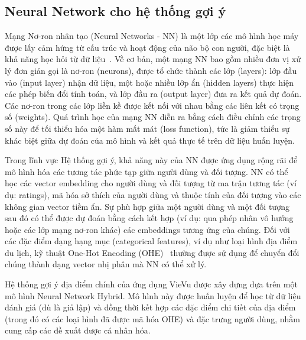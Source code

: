 \subsection{Neural Network cho hệ thống gợi ý}


Mạng Nơ-ron nhân tạo (Neural Networks - NN) là một lớp các mô hình học máy được lấy cảm hứng từ cấu trúc và hoạt động của não bộ con người, đặc biệt là khả năng học hỏi từ dữ liệu~\cite{nn_deep_learning_book}. Về cơ bản, một mạng NN bao gồm nhiều đơn vị xử lý đơn giản gọi là nơ-ron (neurons), được tổ chức thành các lớp (layers): lớp đầu vào (input layer) nhận dữ liệu, một hoặc nhiều lớp ẩn (hidden layers) thực hiện các phép biến đổi tính toán, và lớp đầu ra (output layer) đưa ra kết quả dự đoán. Các nơ-ron trong các lớp liền kề được kết nối với nhau bằng các liên kết có trọng số (weights). Quá trình học của mạng NN diễn ra bằng cách điều chỉnh các trọng số này để tối thiểu hóa một hàm mất mát (loss function), tức là giảm thiểu sự khác biệt giữa dự đoán của mô hình và kết quả thực tế trên dữ liệu huấn luyện.


Trong lĩnh vực Hệ thống gợi ý, khả năng này của NN được ứng dụng rộng rãi để mô hình hóa các tương tác phức tạp giữa người dùng và đối tượng. NN có thể học các vector embedding cho người dùng và đối tượng từ ma trận tương tác (ví dụ: ratings), mã hóa sở thích của người dùng và thuộc tính của đối tượng vào các không gian vector tiềm ẩn. Sự phù hợp giữa một người dùng và một đối tượng sau đó có thể được dự đoán bằng cách kết hợp (ví dụ: qua phép nhân vô hướng hoặc các lớp mạng nơ-ron khác) các embeddings tương ứng của chúng. Đối với các đặc điểm dạng hạng mục (categorical features), ví dụ như loại hình địa điểm du lịch, kỹ thuật One-Hot Encoding (OHE)~\cite{ohe_concept} thường được sử dụng để chuyển đổi chúng thành dạng vector nhị phân mà NN có thể xử lý.

Hệ thống gợi ý địa điểm chính của ứng dụng VieVu được xây dựng dựa trên một mô hình Neural Network Hybrid. Mô hình này được huấn luyện để học từ dữ liệu đánh giá (dù là giả lập) và đồng thời kết hợp các đặc điểm chi tiết của địa điểm (trong đó có các loại hình đã được mã hóa OHE) và đặc trưng người dùng, nhằm cung cấp các đề xuất được cá nhân hóa.

